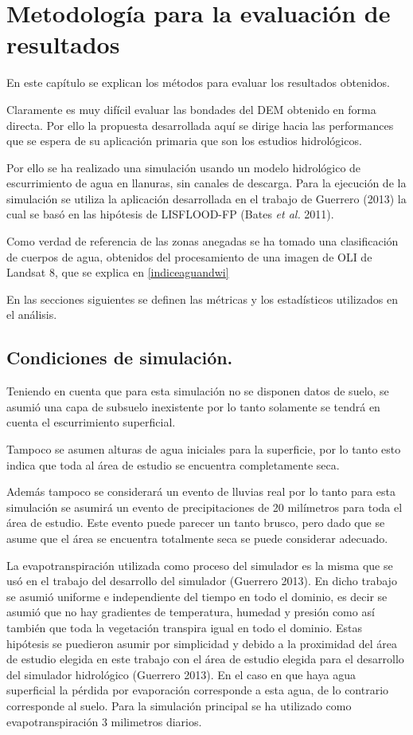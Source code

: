\documentclass[10pt,a4paper, twoside]{report}
\begin{document}
\chapter{Metodología para la evaluación de resultados}

En este capítulo se explican los métodos para evaluar los resultados obtenidos.

Claramente es muy difícil evaluar las bondades del DEM obtenido en forma directa. Por ello la propuesta desarrollada aquí se dirige hacia las performances que se espera de su aplicación primaria que son los estudios hidrológicos.

Por ello se ha realizado una simulación usando un modelo hidrológico de escurrimiento de agua en llanuras, sin canales de descarga. Para la ejecución de la simulación se utiliza la aplicación desarrollada en el trabajo de Guerrero (2013) la cual se basó en las hipótesis de LISFLOOD-FP (Bates \textit{et al.} 2011).

Como verdad de referencia de las zonas anegadas se ha tomado una clasificación de cuerpos de agua, obtenidos del procesamiento de una imagen de OLI de Landsat 8, que se explica en \ref{indiceaguandwi}

En las secciones siguientes se definen las métricas y los estadísticos utilizados en el análisis.

\section{Condiciones de simulación.}
\label{condicionesSimulacion}

Teniendo en cuenta que para esta simulación no se disponen datos de suelo, se asumió una capa de subsuelo inexistente por lo tanto solamente se tendrá en cuenta el escurrimiento superficial.

Tampoco se asumen alturas de agua iniciales para la superficie, por lo tanto esto indica que toda al área de estudio se encuentra completamente seca.

Además tampoco se considerará un evento de lluvias real por lo tanto para esta simulación se asumirá un evento de precipitaciones de 20 milímetros para toda el área de estudio. Este evento puede parecer un tanto brusco, pero dado que se asume que el área se encuentra totalmente seca se puede considerar adecuado.

La evapotranspiración utilizada como proceso del simulador es la misma que se usó en el trabajo del desarrollo del simulador (Guerrero 2013). En dicho trabajo se asumió uniforme e independiente del tiempo en todo el dominio, es decir se asumió que no hay gradientes de temperatura, humedad y presión como así también que toda la vegetación transpira igual en todo el dominio. Estas hipótesis se puedieron asumir por simplicidad y debido a la proximidad del área de estudio elegida en este trabajo con el área de estudio elegida para el desarrollo del simulador hidrológico (Guerrero 2013). En el caso en que haya agua superficial la pérdida por evaporación corresponde a esta agua, de lo contrario corresponde al suelo. Para la simulación principal se ha utilizado como evapotranspiración 3 milimetros diarios.
\end{document}
